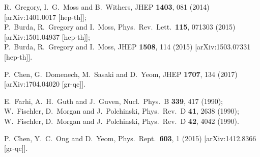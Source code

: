 \documentclass[preprintnumbers,10pt,nofootinbib]{revtex4}
\begin{document}
\begin{thebibliography}{200}
  R.~Gregory, I.~G.~Moss and B.~Withers,
  JHEP {\bf 1403}, 081 (2014)
  [arXiv:1401.0017 [hep-th]];\\
  P.~Burda, R.~Gregory and I.~Moss,
  Phys.\ Rev.\ Lett.\  {\bf 115}, 071303 (2015)
  [arXiv:1501.04937 [hep-th]];\\
  P.~Burda, R.~Gregory and I.~Moss,
  JHEP {\bf 1508}, 114 (2015)
  [arXiv:1503.07331 [hep-th]].

  P.~Chen, G.~Domenech, M.~Sasaki and D.~Yeom,
  JHEP {\bf 1707}, 134 (2017)
  [arXiv:1704.04020 [gr-qc]].

  E.~Farhi, A.~H.~Guth and J.~Guven,
  Nucl.\ Phys.\ B {\bf 339}, 417 (1990);\\
  W.~Fischler, D.~Morgan and J.~Polchinski,
  Phys.\ Rev.\ D {\bf 41}, 2638 (1990);\\
  W.~Fischler, D.~Morgan and J.~Polchinski,
  Phys.\ Rev.\ D {\bf 42}, 4042 (1990).

  P.~Chen, Y.~C.~Ong and D.~Yeom,
  Phys.\ Rept.\  {\bf 603}, 1 (2015)
  [arXiv:1412.8366 [gr-qc]].


\end{thebibliography}
\end{document}
